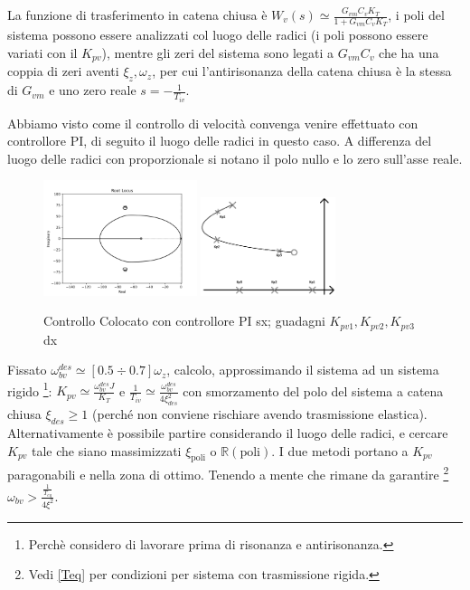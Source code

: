 La funzione di trasferimento in catena chiusa è \(W_v(s) \simeq \frac{G_{vm}C_v K_T}{1+G_{vm}C_v K_T}\), i poli del sistema possono essere analizzati col luogo delle radici (i poli possono essere variati con il \(K_{pv}\)), mentre gli zeri del sistema sono legati a \(G_{vm}C_v\) che ha una coppia di zeri aventi \(\xi_z, \omega_z\), per cui l'antirisonanza della catena chiusa è la stessa di \(G_{vm}\) e uno zero reale \(s=-\frac{1}{T_{iv}}\).

Abbiamo visto come il controllo di velocità convenga venire effettuato con controllore PI, di seguito il luogo delle radici in questo caso. A differenza del luogo delle radici con proporzionale si notano il polo nullo e lo zero sull'asse reale.

\begin{figure}[h]
    \centering
    \includegraphics[width=0.4\textwidth]{Immagini/controllo_v_colocato_PI.png}
    \includegraphics[width=0.35\textwidth]{Immagini/rlocus_vari_guadagni_controlloVel_PI.png}
    \caption{Controllo Colocato con controllore PI sx; guadagni \(K_{pv1},K_{pv2},K_{pv3}\) dx}
\end{figure}

Fissato \(\omega_{bv}^{des} \simeq [0.5\div 0.7]\omega_z\), calcolo, approssimando il sistema ad un sistema rigido \footnote{Perchè considero di lavorare prima di risonanza e antirisonanza.}: \(K_{pv} \simeq \frac{\omega_{bv}^{des} J}{K_T}\) e \(\frac{1}{T_{iv}} \simeq \frac{\omega_{bv}^{des}}{4 \xi_{des}^2}\) con smorzamento del polo del sistema a catena chiusa \(\xi_{des} \geqslant 1\) (perché non conviene rischiare avendo trasmissione elastica).
Alternativamente è possibile partire considerando il luogo delle radici, e cercare \(K_{pv}\) tale che siano massimizzati \(\xi_\text{poli}\) o \(\mathbb{R}(\text{poli})\).
I due metodi portano a \(K_{pv}\) paragonabili e nella zona di ottimo.
Tenendo a mente che rimane da garantire \footnote{Vedi \ref{Teq} per condizioni per sistema con trasmissione rigida.} \(\omega_{bv} > \frac{\frac{1}{T_{eq}}}{4\xi^2}\).

